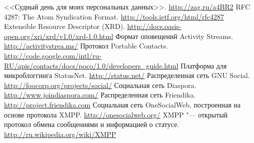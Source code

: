 \documentclass[10pt, a5paper]{article}
\begin{document}
\begin{thebibliography}{99}
	 <<Судный день для моих персональных данных>>. \url{http://zag.ru/a4BR2}
	 RFC 4287: The Atom Syndication Format. \url{http://tools.ietf.org/html/rfc4287}
	 Extensible Resource Descriptor (XRD). \url{http://docs.oasis-open.org/xri/xrd/v1.0/xrd-1.0.html}
	 Формат оповещений Activity Streams. \url{http://activitystrea.ms/}
	 Протокол Portable Contacts. \url{http://code.google.com/intl/ru-RU/apis/contacts/docs/poco/1.0/developers_guide.html}
	 Платформа для микроблоггинга StatusNet. \url{http://status.net/}
	 Распределенная сеть GNU Social. \url{http://foocorp.org/projects/social/}
	 Социальная сеть Diaspora. \url{http://www.joindiaspora.com/}
	 Распределенная сеть Friendika. \url{http://project.friendika.com}
	 Социальная сеть OneSocialWeb, построенная на основе протокола XMPP. \url{http://onesocialweb.org/}
	 XMPP "--- открытый протокол обмена сообщениями и информацией о статусе. \url{http://ru.wikipedia.org/wiki/XMPP}
\end{thebibliography}
\end{document}
